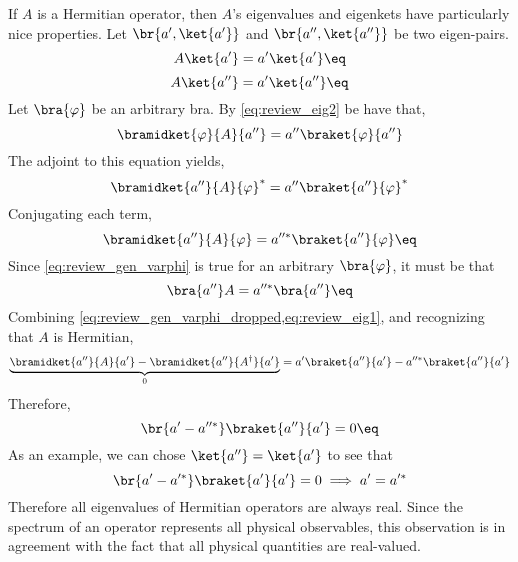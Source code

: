 \documentclass{article}
\begin{document}
If $A$ is a Hermitian operator, then $A$'s eigenvalues and eigenkets have particularly nice properties. Let $\br{a', \ket{a'}}$ and $\br{a'', \ket{a''}}$ be two eigen-pairs.
\[ A \ket{a'} = a' \ket{a'} \eq \label{eq:review_eig1}\]
\[ A \ket{a''} = a' \ket{a''} \eq \label{eq:review_eig2} \]
Let $\bra{\varphi}$ be an arbitrary bra. By \cref{eq:review_eig2} be have that,
\[ \bramidket{\varphi}{A}{a''} = a'' \braket{\varphi}{a''} \]
The adjoint to this equation yields,
\[ \bramidket{a''}{A}{\varphi}^{*} = a'' \braket{a''}{\varphi}^{*} \]
Conjugating each term,
\[ \bramidket{a''}{A}{\varphi} = a''^{*} \braket{a''}{\varphi} \eq \label{eq:review_gen_varphi}\]
Since \cref{eq:review_gen_varphi} is true for an arbitrary $\bra{\varphi}$, it must be that
\[ \bra{a''}A = a''^{*} \bra{a''} \eq \label{eq:review_gen_varphi_dropped} \]
Combining \cref{eq:review_gen_varphi_dropped,eq:review_eig1}, and recognizing that $A$ is Hermitian,
\[ \underbrace{\bramidket{a''}{A}{a'} - \bramidket{a''}{A^\dagger}{a'}}_{0} = a' \braket{a''}{a'} - a''^{*} \braket{a''}{a'} \]
Therefore,
\[ \br{a' - a''^{*}}\braket{a''}{a'} = 0 \eq \label{eq:review_aa}\]
As an example, we can chose $\ket{a''} = \ket{a'}$ to see that
\[ \br{a' - a'^{*}}\braket{a'}{a'} = 0 \implies a' = a'^{*}\]
Therefore all eigenvalues of Hermitian operators are always real. Since the spectrum of an operator represents all physical observables, this observation is in agreement with the fact that all physical quantities are real-valued. \\
\end{document}
